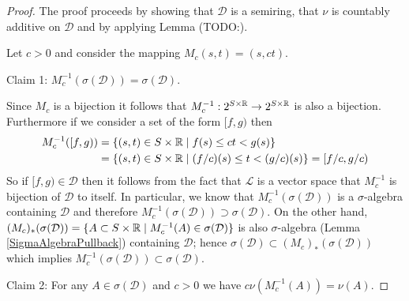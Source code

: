 \begin{proof}
The proof proceeds by showing that $\mathcal{D}$ is a semiring, that
$\nu$ is countably additive on $\mathcal{D}$ and by applying Lemma (TODO:).

Let $c > 0$ and consider the mapping $M_c(s,t) = (s, ct)$.  

Claim 1: $M_c^{-1}(\sigma(\mathcal{D})) = \sigma(\mathcal{D})$.

Since $M_c$ is a bijection it follows that $M_c^{-1} : 2^{S \times \mathbb{R}}
\to 2^{S \times \mathbb{R}}$ is also a bijection.  Furthermore if we
consider a set of the form $[f,g)$ then 
\begin{align*}
M_c^{-1}([f,g)) &= \lbrace (s,t) \in S \times \mathbb{R} \mid f(s) \leq ct
< g(s) \rbrace \\
&= \lbrace (s,t) \in S \times \mathbb{R} \mid (f/c)(s) \leq t
< (g/c)(s) \rbrace = [f/c, g/c)
\end{align*}
So if $[f,g) \in \mathcal{D}$ then it follows from the fact that
$\mathcal{L}$ is a vector space that $M_c^{-1}$ is bijection of
$\mathcal{D}$
to itself.  In particular, we know that $M_c^{-1}
(\sigma(\mathcal{D}))$ is a $\sigma$-algebra containing $\mathcal{D}$
  and therefore $M_c^{-1}
(\sigma(\mathcal{D})) \supset \sigma(\mathcal{D})$.  On the other
  hand, $(M_c)_*(\sigma(\mathcal{D})) = \lbrace A \subset S \times
  \mathbb{R} \mid M_c^{-1}(A) \in \sigma(\mathcal{D}) \rbrace$ is also
  $\sigma$-algebra (Lemma \ref{SigmaAlgebraPullback}) containing
  $\mathcal{D}$; hence $\sigma(\mathcal{D}) \subset
  (M_c)_*(\sigma(\mathcal{D}))$ which implies
  $M_c^{-1}(\sigma(\mathcal{D})) \subset \sigma(\mathcal{D})$.

Claim 2: For any $A \in \sigma(\mathcal{D})$ and $c > 0$ we have $c
\nu(M_c^{-1}(A)) = \nu(A)$.


\end{proof}
